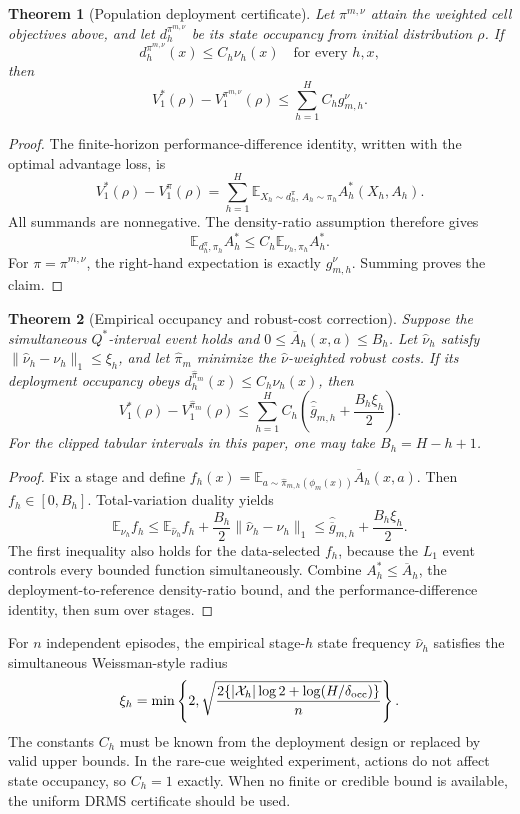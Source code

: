 \documentclass[letterpaper]{article} %
\newtheorem{theorem}{Theorem}
\newcommand{\E}{\mathbb E}
\newcommand{\cX}{\mathcal X}
\begin{document}
\begin{theorem}[Population deployment certificate]
Let \(\pi^{m,\nu}\) attain the weighted cell objectives above, and let
\(d_h^{\pi^{m,\nu}}\) be its state occupancy from initial distribution
\(\rho\).  If
\[
 d_h^{\pi^{m,\nu}}(x)\leq C_h\nu_h(x)
 \quad\text{for every }h,x,
\]
then
\[
 V_1^*(\rho)-V_1^{\pi^{m,\nu}}(\rho)
 \leq\sum_{h=1}^H C_hg_{m,h}^{\nu}.
\]
\end{theorem}
\begin{proof}
The finite-horizon performance-difference identity, written with the optimal
advantage loss, is
\[
 V_1^*(\rho)-V_1^{\pi}(\rho)
 =\sum_{h=1}^H
 \E_{X_h\sim d_h^\pi,\,A_h\sim\pi_h}
 A_h^*(X_h,A_h).
\]
All summands are nonnegative.  The density-ratio assumption therefore gives
\[
 \E_{d_h^\pi,\pi_h}A_h^*
 \leq C_h\E_{\nu_h,\pi_h}A_h^*.
\]
For \(\pi=\pi^{m,\nu}\), the right-hand expectation is exactly
\(g_{m,h}^{\nu}\).  Summing proves the claim.
\end{proof}

\begin{theorem}[Empirical occupancy and robust-cost correction]
Suppose the simultaneous \(Q^*\)-interval event holds and
\(0\leq\overline A_h(x,a)\leq B_h\).  Let
\(\widehat\nu_h\) satisfy
\(\|\widehat\nu_h-\nu_h\|_1\leq\xi_h\), and let
\(\widehat\pi_m\) minimize the \(\widehat\nu\)-weighted robust costs.
If its deployment occupancy obeys
\(d_h^{\widehat\pi_m}(x)\leq C_h\nu_h(x)\), then
\[
 V_1^*(\rho)-V_1^{\widehat\pi_m}(\rho)
 \leq\sum_{h=1}^H C_h\left(
 \widehat{\overline g}_{m,h}+\frac{B_h\xi_h}{2}\right).
\]
For the clipped tabular intervals in this paper, one may take
\(B_h=H-h+1\).
\end{theorem}
\begin{proof}
Fix a stage and define
\(f_h(x)=\E_{a\sim\widehat\pi_{m,h}(\phi_m(x))}\overline A_h(x,a)\).
Then \(f_h\in[0,B_h]\).  Total-variation duality yields
\[
 \E_{\nu_h}f_h
 \leq \E_{\widehat\nu_h}f_h+\frac{B_h}{2}
 \|\widehat\nu_h-\nu_h\|_1
 \leq\widehat{\overline g}_{m,h}+\frac{B_h\xi_h}{2}.
\]
The first inequality also holds for the data-selected \(f_h\), because the
\(L_1\) event controls every bounded function simultaneously.  Combine
\(A_h^*\leq\overline A_h\), the deployment-to-reference density-ratio bound,
and the performance-difference identity, then sum over stages.
\end{proof}

For \(n\) independent episodes, the empirical stage-\(h\) state frequency
\(\widehat\nu_h\) satisfies the simultaneous Weissman-style radius
\[
 \xi_h=\min\left\{2,
 \sqrt{\frac{2\{|\cX_h|\log2+\log(H/\delta_{\rm occ})\}}{n}}
 \right\}.
\]
The constants \(C_h\) must be known from the deployment design or replaced by
valid upper bounds.  In the rare-cue weighted experiment, actions do not affect
state occupancy, so \(C_h=1\) exactly.  When no finite or credible bound is
available, the uniform DRMS certificate should be used.
\end{document}
